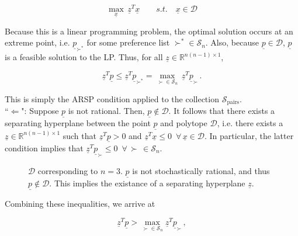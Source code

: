 \documentclass[11pt]{article}
\begin{document}
\begin{equation*}
\max_{\underline{x}} \, \underline{z}^T \underline{x} \qquad s.t. \quad  \underline{x} \in \mathcal{D}
\end{equation*}

Because this is a linear programming problem, the optimal solution occurs at an extreme point, i.e. $\underline{p}_{\succ^*}$ for some preference list $\succ^* \in \mathcal{S}_n$. Also, because $\underline{p} \in \mathcal{D}$, $\underline{p}$ is a feasible solution to the LP. Thus, for all $\underline{z} \in \mathbb{R}^{n(n-1) \times 1}$,

\begin{equation*}
\underline{z}^T \underline{p} \leq \underline{z}^T \underline{p}_{\succ^*} = \max_{\succ \in \mathcal{S}_n} \, \underline{z}^T \underline{p}_{\succ} \, .
\end{equation*}

This is simply the ARSP condition applied to the collection $\mathcal{S}_{\text{pairs}}$.
\\

``$\Leftarrow$": Suppose $\underline{p}$ is not rational. Then, $\underline{p} \notin \mathcal{D}$. It follows that there exists a separating hyperplane between the point $\underline{p}$ and polytope $\mathcal{D}$, i.e. there exists a $\underline{z} \in \mathbb{R}^{n(n-1) \times 1}$ such that $\underline{z}^T\underline{p} > 0$ and $\underline{z}^T\underline{x} \leq 0 \, \, \, \forall \, \underline{x} \in \mathcal{D}$. In particular, the latter condition implies that $\underline{z}^T \underline{p}_{\succ} \leq 0 \, \, \, \forall \, \succ \, \in \mathcal{S}_n$. 

\begin{center}
	\begin{figure}[h]
		\caption{$\mathcal{D}$ corresponding to $n=3$. $\underline{p}$ is not stochastically rational, and thus $\underline{p} \notin \mathcal{D}$. This implies the existance of a separating hyperplane $\underline{z}$.}
	\end{figure}
\end{center}

Combining these inequalities, we arrive at

\begin{equation*}
\underline{z}^T \underline{p} > \max_{\succ \in \mathcal{S}_n} \underline{z}^T \underline{p}_{\succ} \, ,
\end{equation*}
\end{document}
